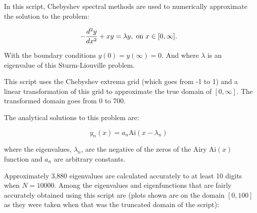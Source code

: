 \documentclass[12pt,a4paper,openright]{article}
\begin{document}
	In this script, Chebyshev spectral methods are used to numerically approximate the solution to the problem:
	
	\[
	- \dfrac{d^2 y}{dx^2} + xy = \lambda y, \hspace{0.1cm}\mathrm{on} \hspace{0.1cm} x\in[0,\infty].
	\]
	
	With the boundary conditions $y(0)=y(\infty)=0$. And where $\lambda$ is an eigenvalue of this Sturm-Liouville problem. 
	
	This script uses the Chebyshev extrema grid (which goes from -1 to 1) and a linear transformation of this grid to approximate the true domain of $[0,\infty]$. The transformed domain goes from 0 to 700. 
		
	The analytical solutions to this problem are:
	
	\[
	y_n(x) = a_n \mathrm{Ai}(x-\lambda_n)
	\]
	
	where the eigenvalues, $\lambda_n$, are the negative of the zeros of the Airy $\mathrm{Ai}(x)$ function and $a_n$ are arbitrary constants. 
	
	Approximately 3,880 eigenvalues are calculated accurately to at least 10 digits when $N=10000$. Among the eigenvalues and eigenfunctions that are fairly accurately obtained using this script are (plots shown are on the domain $ [0,100] $ as they were taken when that was the truncated domain of the script):
\end{document}
